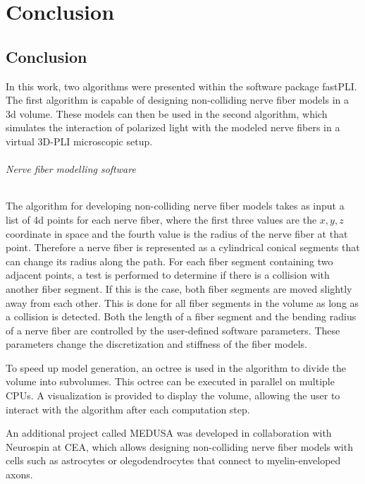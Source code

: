 \newpage\null\thispagestyle{empty}\newpage
\clearpage{\thispagestyle{empty}\cleardoublepage}
\part{Conclusion}
% 
% 
% 
\setcounter{chapter}{10}
\chapter{Conclusion}
\label{sec:conclusion}
% 
In this work, two algorithms were presented within the software package \ac{fastPLI}.
The first algorithm is capable of designing non-colliding nerve fiber models in a 3d volume.
These models can then be used in the second algorithm, which simulates the interaction of polarized light with the modeled nerve fibers in a virtual \ac{3D-PLI} microscopic setup.
% 
% 
% 
\paragraph{Nerve fiber modelling software}
% 
The algorithm for developing non-colliding nerve fiber models takes as input a list of 4d points for each nerve fiber, where the first three values are the $x,y,z$ coordinate in space and the fourth value is the radius of the nerve fiber at that point.
Therefore a nerve fiber is represented as a cylindrical conical segments that can change its radius along the path.
For each fiber segment containing two adjacent points, a test is performed to determine if there is a collision with another fiber segment.
If this is the case, both fiber segments are moved slightly away from each other.
This is done for all fiber segments in the volume as long as a collision is detected.
Both the length of a fiber segment and the bending radius of a nerve fiber are controlled by the user-defined software parameters.
These parameters change the discretization and stiffness of the fiber models.
\par
% 
To speed up model generation, an octree is used in the algorithm to divide the volume into subvolumes.
This octree can be executed in parallel on multiple \acp{CPU}.
A visualization is provided to display the volume, allowing the user to interact with the algorithm after each computation step.
\par
% 
An additional project called \ac{MEDUSA} was developed in collaboration with Neurospin at \ac{CEA}, which allows designing non-colliding nerve fiber models with cells such as astrocytes or olegodendrocytes that connect to myelin-enveloped axons.
% 
% 
% 
